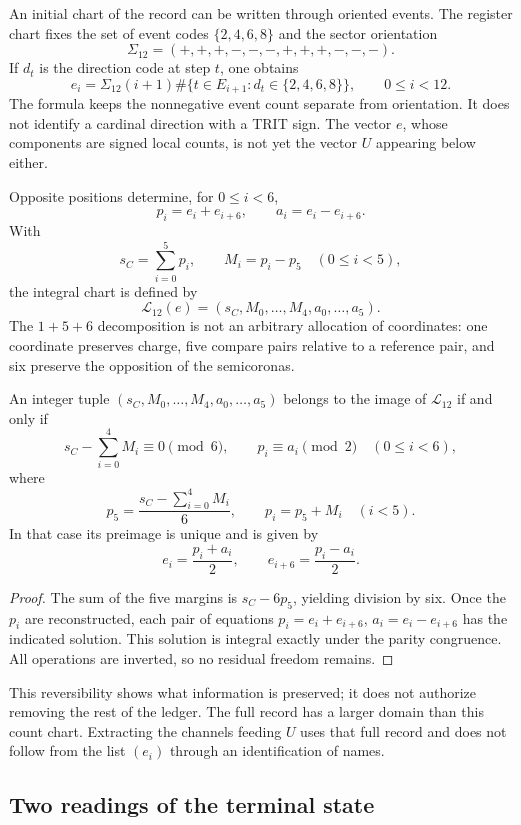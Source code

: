 An initial chart of the record can be written through oriented
events. The register chart fixes the set of event codes
\(\{2,4,6,8\}\) and the sector orientation
\[
 \Sigma_{12}=(+,+,+,-,-,-,+,+,+,-,-,-).
\]
If \(d_t\) is the direction code at step \(t\), one obtains
\[
 e_i=\Sigma_{12}(i+1)
 \#\{t\in E_{i+1}:d_t\in\{2,4,6,8\}\},
 \qquad0\leq i<12.
\]
The formula keeps the nonnegative event count separate from
orientation. It does not identify a cardinal direction with a TRIT sign. The
vector \(e\), whose components are signed local counts, is not yet
the vector \(U\) appearing below either.

Opposite positions determine, for \(0\leq i<6\),
\[
 p_i=e_i+e_{i+6},\qquad a_i=e_i-e_{i+6}.
\]
With
\[
 s_C=\sum_{i=0}^{5}p_i,\qquad M_i=p_i-p_5\quad(0\leq i<5),
\]
the integral chart is defined by
\[
 \mathcal L_{12}(e)
 =(s_C,M_0,\ldots,M_4,a_0,\ldots,a_5).
\]
The \(1+5+6\) decomposition is not an arbitrary allocation of coordinates:
one coordinate preserves charge, five compare pairs relative to a
reference pair, and six preserve the opposition of the semicoronas.

\begin{lemma}
\label{lem:k-carta-integral}
An integer tuple \((s_C,M_0,\ldots,M_4,a_0,\ldots,a_5)\) belongs to the
image of \(\mathcal L_{12}\) if and only if
\[
 s_C-\sum_{i=0}^{4}M_i\equiv0\pmod6,
 \qquad p_i\equiv a_i\pmod2\quad(0\leq i<6),
\]
where
\[
 p_5=\frac{s_C-\sum_{i=0}^{4}M_i}{6},\qquad p_i=p_5+M_i\quad(i<5).
\]
In that case its preimage is unique and is given by
\[
 e_i=\frac{p_i+a_i}{2},\qquad e_{i+6}=\frac{p_i-a_i}{2}.
\]
\end{lemma}

\begin{proof}
The sum of the five margins is \(s_C-6p_5\), yielding
division by six. Once the \(p_i\) are reconstructed, each pair of equations
\(p_i=e_i+e_{i+6}\), \(a_i=e_i-e_{i+6}\) has the indicated solution.
This solution is integral exactly under the parity congruence. All
operations are inverted, so no residual freedom remains.
\end{proof}

This reversibility shows what information is preserved; it does not authorize
removing the rest of the ledger. The full record has a larger domain
than this count chart. Extracting the channels feeding
\(U\) uses that full record and does not follow from the list
\((e_i)\) through an identification of names.

\subsection{Two readings of the terminal state}
\label{subsec:k-terminal}

